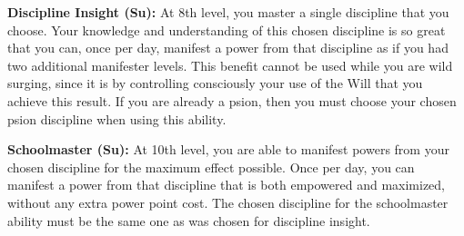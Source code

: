 {\textbf{Discipline Insight (Su):} At 8th level, you master a single discipline that you choose. Your knowledge and understanding of this chosen discipline is so great that you can, once per day, manifest a power from that discipline as if you had two additional manifester levels. This benefit cannot be used while you are wild surging, since it is by controlling consciously your use of the Will that you achieve this result. If you are already a psion, then you must choose your chosen psion discipline when using this ability.

\textbf{Schoolmaster (Su):} At 10th level, you are able to manifest powers from your chosen discipline for the maximum effect possible. Once per day, you can manifest a power from that discipline that is both empowered and maximized, without any extra power point cost. The chosen discipline for the schoolmaster ability must be the same one as was chosen for discipline insight.
}